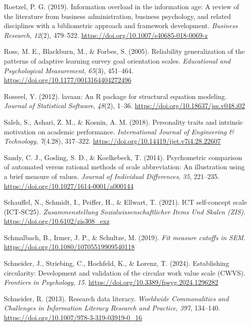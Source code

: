 \documentclass[
  12pt,
  a4paper,
  twoside]{article}
\newlength{\cslhangindent}
\newenvironment{CSLReferences}[2] %
 {\begin{list}{}{%
  \setlength{\itemindent}{0pt}
  \setlength{\leftmargin}{0pt}
  \setlength{\parsep}{0pt}
  \ifodd #1
   \setlength{\leftmargin}{\cslhangindent}
   \setlength{\itemindent}{-1\cslhangindent}
  \fi
  \setlength{\itemsep}{#2\baselineskip}}}
 {\end{list}}
\begin{document}
\begin{CSLReferences}{1}{0}
Roetzel, P. G. (2019). Information overload in the information age: A review of the literature from business administration, business psychology, and related disciplines with a bibliometric approach and framework development. \emph{Business Research}, \emph{12}(2), 479--522. \url{https://doi.org/10.1007/s40685-018-0069-z}

Ross, M. E., Blackburn, M., \& Forbes, S. (2005). Reliability generalization of the patterns of adaptive learning survey goal orientation scales. \emph{Educational and Psychological Measurement}, \emph{65}(3), 451--464. \url{https://doi.org/10.1177/0013164404272496}

Rosseel, Y. (2012). {lavaan}: An {R} package for structural equation modeling. \emph{Journal of Statistical Software}, \emph{48}(2), 1--36. \url{https://doi.org/10.18637/jss.v048.i02}

Saleh, S., Ashari, Z. M., \& Kosnin, A. M. (2018). Personality traits and intrinsic motivation on academic performance. \emph{International Journal of Engineering \& Technology}, \emph{7}(4.28), 317--322. \url{https://doi.org/10.14419/ijet.v7i4.28.22607}

Sandy, C. J., Gosling, S. D., \& Koelkebeck, T. (2014). Psychometric comparison of automated versus rational methods of scale abbreviation: An illustration using a brief measure of values. \emph{Journal of Individual Differences}, \emph{35}, 221--235. \url{https://doi.org/10.1027/1614-0001/a000144}

Schauffel, N., Schmidt, I., Peiffer, H., \& Ellwart, T. (2021). ICT self-concept scale (ICT-SC25). \emph{Zusammenstellung Sozialwissenschaftlicher Items Und Skalen (ZIS)}. \url{https://doi.org/10.6102/zis308_exz}

Schmalbach, B., Irmer, J. P., \& Schultze, M. (2019). \emph{Fit measure cutoffs in SEM}. \url{https://doi.org/10.1080/10705519909540118}

Schneider, J., Striebing, C., Hochfeld, K., \& Lorenz, T. (2024). Establishing circularity: Development and validation of the circular work value scale (CWVS). \emph{Frontiers in Psychology}, \emph{15}. \url{https://doi.org/10.3389/fpsyg.2024.1296282}

Schneider, R. (2013). Research data literacy. \emph{Worldwide Commonalities and Challenges in Information Literacy Research and Practice}, \emph{397}, 134--140. \url{https://doi.org/10.1007/978-3-319-03919-0_16}


\end{CSLReferences}
\end{document}
